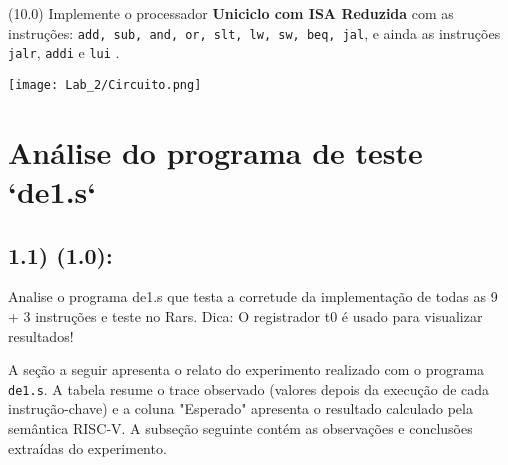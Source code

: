 \documentclass[12pt,a4paper]{article}
\begin{document}
(10.0) Implemente o processador \textbf{Uniciclo com ISA Reduzida} com as instruções:
\texttt{add, sub, and, or, slt, lw, sw, beq, jal}, e ainda as instruções \texttt{jalr}, \texttt{addi} e \texttt{lui} . 

\begin{center}
    \texttt{[image: Lab\_2/Circuito.png]}
\end{center}



\section{Análise do programa de teste `de1.s`}

\subsection{1.1) (1.0):} Analise o programa de1.s que testa a corretude da implementação de todas as 9 + 3 instruções e
teste no Rars. Dica: O registrador t0 é usado para visualizar resultados!

A seção a seguir apresenta o relato do experimento realizado com o programa \texttt{de1.s}. A tabela resume o trace observado (valores depois da execução de cada instrução-chave) e a coluna "Esperado" apresenta o resultado calculado pela semântica RISC‑V. A subseção seguinte contém as observações e conclusões extraídas do experimento.
\end{document}
